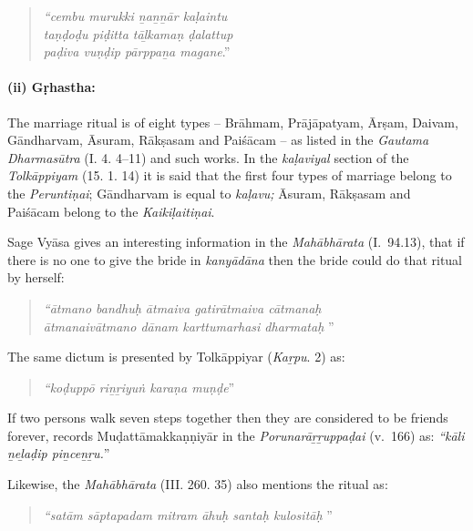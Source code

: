 \begin{quote}
\textit{“cembu murukki ṉaṉṉār kaḷaintu}\\\textit{taṇḍoḍu piḍitta tāḻkamaṇ ḍalattup}\\\textit{paḍiva vuṇḍip pārppaṉa magane}.”
\end{quote}


\paragraph*{(ii) Gṛhastha:}

\vskip -7pt

The marriage ritual is of eight types – Brāhmam, Prājāpatyam, Ārṣam, Daivam, Gāndharvam, Āsuram, Rākṣasam and Paiśācam – as listed in the \textit{Gautama Dharmasūtra} (I. 4. 4–11) and such works. In the \textit{kaḷaviyal} section of the \textit{Tolkāppiyam} (15. 1. 14) it is said that the first four types of marriage belong to the \textit{Peruntiṇai}; Gāndharvam is equal to \textit{kaḷavu;} Āsuram, Rākṣasam and Paiśācam belong to the \textit{Kaikiḷaitiṇai}.

Sage Vyāsa gives an interesting information in the \textit{Mahābhārata} (I.~94.13), that if there is no one to give the bride in \textit{kanyādāna} then the bride could do that ritual by herself:

\begin{quote}
\textit{“ātmano bandhuḥ ātmaiva gatirātmaiva cātmanaḥ}\\\textit{ātmanaivātmano dānam karttumarhasi dharmataḥ }”
\end{quote}

The same dictum is presented by Tolkāppiyar (\textit{Kaṟpu}. 2) as:

\begin{quote}
\textit{“koḍuppō riṉṟiyuṅ karaṇa muṇḍe}”
\end{quote}

If two persons walk seven steps together then they are considered to be friends forever, records Muḍattāmakkaṇṇiyār in the \textit{Porunarāṟṟuppaḍai} (v.~166) as: \textit{“kāli ṉeḻaḍip piṉceṉṟu.}”

Likewise, the \textit{Mahābhārata} (III. 260. 35) also mentions the ritual as:

\begin{quote}
\textit{“satām sāptapadam mitram āhuḥ santaḥ kulositāḥ }”
\end{quote}

